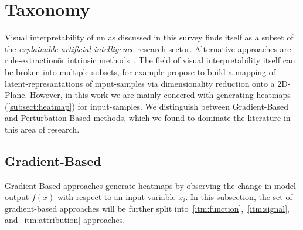 \section{Taxonomy}
Visual interpretability of \gls{nn} as discussed in this survey finds itself as a subset of the \textit{explainable artificial intelligence}-research sector. Alternative approaches are rule-extraction\= or intrinsic methods~\cite{ras2018explanation}. The field of visual interpretability itself can be broken into multiple subsets, for example  propose to build a mapping of latent-represantations of input-samples via dimensionality reduction onto a 2D-Plane. However, in this work we are mainly concered with generating heatmaps (\cref{subsect:heatmap}) for input-samples. We distinguish between Gradient-Based and Perturbation-Based methods, which we found to dominate the literature in this area of research.

\subsection{Gradient-Based} Gradient-Based approaches generate heatmaps by observing the change in model-output \(f(x)\) with respect to an input-variable \(x_i\). In this subsection, the set of gradient-based approaches will be further split into~\ref{itm:function},~\ref{itm:signal}, and~\ref{itm:attribution} approaches. 
